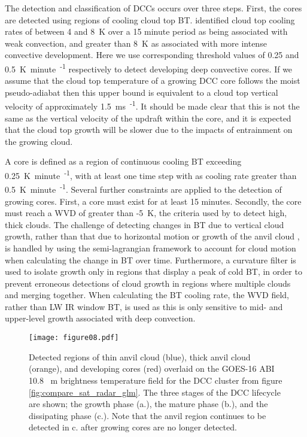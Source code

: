 The detection and classification of DCCs occurs over three steps.
First, the cores are detected using regions of cooling cloud top BT.
\citet{roberts_nowcasting_2003} identified cloud top cooling rates of between 4 and 8~\unit{K} over a 15 minute period as being associated with weak convection, and greater than 8~\unit{K} as associated with more intense convective development.
Here we use corresponding threshold values of 0.25 and 0.5~\unit{K minute\textsuperscript{-1}} respectively to detect developing deep convective cores.
If we assume that the cloud top temperature of a growing DCC core follows the moist pseudo-adiabat then this upper bound is equivalent to a cloud top vertical velocity of approximately 1.5~\unit{ms\textsuperscript{-1}}.
It should be made clear that this is not the same as the vertical velocity of the updraft within the core, and it is expected that the cloud top growth will be slower due to the impacts of entrainment on the growing cloud.

A core is defined as a region of continuous cooling BT exceeding 0.25~\unit{K minute\textsuperscript{-1}}, with at least one time step with as cooling rate greater than 0.5~\unit{K minute\textsuperscript{-1}}.
Several further constraints are applied to the detection of growing cores.
First, a core must exist for at least 15 minutes.
Secondly, the core must reach a WVD of greater than -5~\unit{K}, the criteria used by \citet{muller_role_2018} to detect high, thick clouds.
The challenge of detecting changes in BT due to vertical cloud growth, rather than that due to horizontal motion or growth of the anvil cloud \citep{hartung_intercomparison_2013}, is handled by using the semi-lagrangian framework to account for cloud motion when calculating the change in BT over time.
Furthermore, a curvature filter is used to isolate growth only in regions that display a peak of cold BT, in order to prevent erroneous detections of cloud growth in regions where multiple clouds and merging together.
When calculating the BT cooling rate, the WVD field, rather than LW IR window BT, is used as this is only sensitive to mid- and upper-level growth associated with deep convection.

\begin{figure}[t]
    \centering
    \texttt{[image: figure08.pdf]}
    \caption{Detected regions of thin anvil cloud (blue), thick anvil cloud (orange), and developing cores (red) overlaid on the GOES-16 ABI 10.8 \unit{\mu m} brightness temperature field for the DCC cluster from figure \ref{fig:compare_sat_radar_glm}. The three stages of the DCC lifecycle are shown; the growth phase (a.), the mature phase (b.), and the dissipating phase (c.). Note that the anvil region continues to be detected in c. after growing cores are no longer detected.}
    \label{fig:detected_anvils}
\end{figure}

